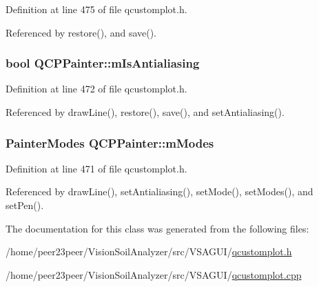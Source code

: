 Definition at line 475 of file qcustomplot.\+h.



Referenced by restore(), and save().

\hypertarget{class_q_c_p_painter_a7055085da176aee0f6b23298f1003d08}{}
\subsubsection[{m\+Is\+Antialiasing}]{\setlength{\rightskip}{0pt plus 5cm}bool Q\+C\+P\+Painter\+::m\+Is\+Antialiasing\hspace{0.3cm}{\ttfamily [protected]}}\label{class_q_c_p_painter_a7055085da176aee0f6b23298f1003d08}


Definition at line 472 of file qcustomplot.\+h.



Referenced by draw\+Line(), restore(), save(), and set\+Antialiasing().

\hypertarget{class_q_c_p_painter_af5d1d6e5df0adbc7de5633250fb3396c}{}
\subsubsection[{m\+Modes}]{\setlength{\rightskip}{0pt plus 5cm}Painter\+Modes Q\+C\+P\+Painter\+::m\+Modes\hspace{0.3cm}{\ttfamily [protected]}}\label{class_q_c_p_painter_af5d1d6e5df0adbc7de5633250fb3396c}


Definition at line 471 of file qcustomplot.\+h.



Referenced by draw\+Line(), set\+Antialiasing(), set\+Mode(), set\+Modes(), and set\+Pen().



The documentation for this class was generated from the following files\+:\begin{DoxyCompactItemize}
\item 
/home/peer23peer/\+Vision\+Soil\+Analyzer/src/\+V\+S\+A\+G\+U\+I/\hyperlink{qcustomplot_8h}{qcustomplot.\+h}\item 
/home/peer23peer/\+Vision\+Soil\+Analyzer/src/\+V\+S\+A\+G\+U\+I/\hyperlink{qcustomplot_8cpp}{qcustomplot.\+cpp}\end{DoxyCompactItemize}
